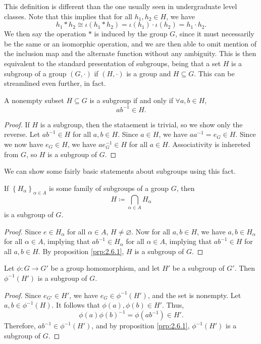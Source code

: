 This definition is different than the one usually seen in undergraduate level classes. Note that this implies that for all $h_1,h_2\in H$, we have
\[
	h_1*h_2 \cong \iota (h_1 * h_2)=\iota (h_1) \cdot \iota (h_2)=h_1\cdot h_2
.\]
We then say the operation $*$ is induced by the group $G$, since it must necessarily be the same or an isomorphic operation, and we are then able to omit mention of the inclusion map and the alternate function without any ambiguity. This is then equivalent to the standard presentation of subgroups, being that a set $H$ is a subgroup of a group $(G,\cdot )$ if $(H,\cdot )$ is a group and $H\subseteq G$. This can be streamlined even further, in fact.
\begin{proposition}\label{prp:2.6.1}
	A nonempty subset $H\subseteq G$ is a subgroup if and only if $\forall a,b\in H$,
	\[
		ab^{-1}\in H
	.\]
\end{proposition}
\begin{proof}
	If $H$ is a subgroup, then the stataement is trivial, so we show only the reverse. Let $ab^{-1}\in H$ for all $a,b\in H$. Since $a\in H$, we have $aa^{-1}=e_G\in H$. Since we now have $e_G\in H$, we have $ae_G^{-1}\in H$ for all $a\in H$. Associativity is inhereted from $G$, so $H$ is a subgroup of $G$.
\end{proof}
We can show some fairly basic statements about subgroups using this fact.
\begin{lemma}\label{lma:2.6.1}
	If $\left\{ H_\alpha  \right\}_{\alpha \in A}$ is some family of subgroups of a group $G$, then
	\[
		H\coloneqq \bigcap_{\alpha \in A} H_\alpha 
	\]
	is a subgroup of $G$.
\end{lemma}
\begin{proof}
	Since $e\in H_\alpha $ for all $\alpha \in A$, $H\neq \varnothing$. Now for all $a,b\in H$, we have $a,b\in H_\alpha $ for all $\alpha \in A$, implying that $ab^{-1}\in H_\alpha $ for all $\alpha \in A$, implying that $ab^{-1}\in H$ for all $a,b\in H$. By proposition \ref{prp:2.6.1}, $H$ is a subgroup of $G$.
\end{proof}
\begin{lemma}\label{lma:2.6.2}
	Let $\phi : G \to G'$ be a group homomorphism, and let $H'$ be a subgroup of $G'$. Then $\phi ^{-1}(H')$ is a subgroup of $G$.
\end{lemma}
\begin{proof}
	Since $e_{G'}\in H'$, we have $e_G\in \phi ^{-1}(H')$, and the set is nonempty. Let $a,b\in \phi ^{-1}(H)$. It follows that $\phi (a),\phi (b)\in H'$. Thus,
	 \[
		 \phi (a)\phi (b)^{-1}=\phi \left( ab^{-1} \right) \in H'
	.\]
	Therefore, $ab^{-1}\in \phi ^{-1}(H')$, and by proposition \ref{prp:2.6.1},  $\phi ^{-1}(H')$ is a subgroup of $G$.
\end{proof}

